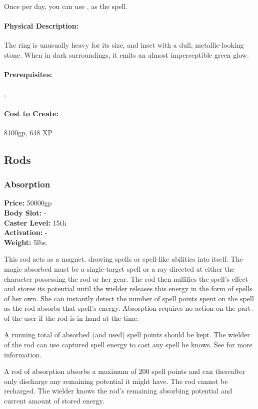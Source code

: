 Once per day, you can use , as the spell.

\paragraph{Physical Description:} The ring is unusually heavy for its size, and inset with a dull, metallic-looking stone. When in dark surroundings, it emits an almost imperceptible green glow.

\paragraph{Prerequisites:} , 

\paragraph{Cost to Create:} 8100gp, 648 XP
\subsection{Rods}
\subsubsection{Absorption}
\textbf{Price:} 50000gp\\
\textbf{Body Slot:} -\\
\textbf{Caster Level:} 15th\\
\textbf{Activation:} -\\
\textbf{Weight:} 5lbs.

This rod acts as a magnet, drawing spells or spell-like abilities into itself. 
The magic absorbed must be a single-target spell or a ray directed at either the character possessing the rod or her gear. 
The rod then nullifies the spell's effect and stores its potential until the wielder releases this energy in the form of spells of her own. 
She can instantly detect the number of spell points spent on the spell as the rod absorbs that spell's energy. 
Absorption requires no action on the part of the user if the rod is in hand at the time.

A running total of absorbed (and used) spell points should be kept. 
The wielder of the rod can use captured spell energy to cast any spell he knows.
See  for more information.

A rod of absorption absorbs a maximum of 200 spell points and can thereafter only discharge any remaining potential it might have. The rod cannot be recharged. The wielder knows the rod's remaining absorbing potential and current amount of stored energy.

